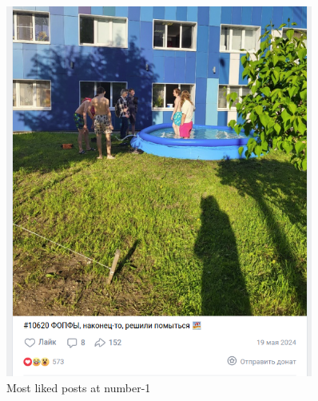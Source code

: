 \documentclass[
	12pt
] {article}
\begin{document}
	\newpage	
	\vspace*{\fill}
	\begin{figure}[H]
		\centering
		\includegraphics[width=0.9\textwidth]{fig-top-posts-1}
		\caption{Most liked posts at number-1}
		\label{fig-top-posts-1}
	\end{figure}
	\vfill
\newpage
\end{document}
